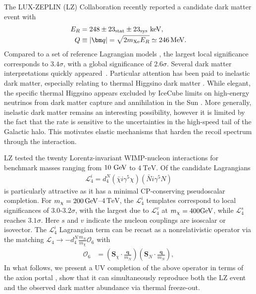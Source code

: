 \documentclass[notitlepage,floats,aps,nofootinbib,preprintnumbers,twocolumn,prl,10pt,balancelastpage]{revtex4-1}
\def\beq{\begin{equation}\begin{aligned}}
\def\eeq{\end{aligned}\end{equation}}
\newcommand{\Lag}{\mathcal L}
\newcommand{\Ocal}{\mathcal O}
\begin{document}
The LUX-ZEPLIN (LZ) Collaboration recently reported a candidate dark matter event with \cite{LZ:2026axp}
\begin{align}
 E_R&=248\pm23_{\rm stat}\pm23_{\rm sys}\ \mathrm{keV},\nonumber\\[-2pt]
 Q&\equiv|\bm q|=\sqrt{2m_{\rm Xe}E_R}\simeq246\,\mathrm{MeV}.
 \label{eq:event}
\end{align}
%
Compared to a set of reference Lagrangian models \cite{Anand:2013yka}, the largest local significance corresponds to $3.4\sigma$, with a  global significance of $2.6\sigma$.
%
Several dark matter interpretations quickly appeared~\cite{Lou:2026idn,Su:2026rwz,Yamashita:2026ump,Fan:2026kxx,Freese:2026sga,Wu:2026nhi,Yamashita:2026ump,Yin:2026jnn,DiMauro:2026ldr,Visinelli:2026kgt}.
Particular attention has been paid to inelastic dark matter, especially relating to thermal Higgsino dark matter
\cite{Fan:2026kxx,Freese:2026sga,Wu:2026nhi,Yamashita:2026ump,Yin:2026jnn,DiMauro:2026ldr,Visinelli:2026kgt}.
%
 While elegant, the specific thermal Higgsino appears excluded by IceCube limits on high-energy neutrinos from dark matter capture and annihilation in the Sun \cite{Pospelov:2026ewn}. More generally, inelastic dark matter remains an interesting possibility, however it is limited by the fact that the rate is sensitive to the uncertainties in the high-speed tail of the Galactic halo.  This motivates elastic mechanisms that harden the recoil spectrum through the interaction.


LZ tested the twenty Lorentz-invariant WIMP-nucleon interactions for benchmark masses ranging from $10~{\rm GeV}$ to $4~\mathrm{TeV}$.
%
Of the candidate Lagrangians 
\beq
\Lag_4^i=d_4^N(\bar\chi i\gamma^5\chi)(\bar N i\gamma^5N)
\eeq is particularly attractive as it has a minimal CP-conserving
pseudoscalar completion.
%
For $m_\chi=200\,{\rm GeV}$--$4\,\mathrm{TeV}$,  the  $\Lag_4^i$ templates correspond to local significances of
$3.0$-$3.2\sigma$, with the largest due to $\Lag_4^v$ at
$m_\chi=400{\rm GeV}$, while $\Lag_4^s$ reaches $3.1\sigma$.  Here $s$ and $v$ indicate the nucleon couplings are isoscalar or isovector.  The $\Lag_4^i$ Lagrangian term can be recast as a nonrelativistic operator via the matching  $\Lag_4 \rightarrow -d_4^N\frac{m_N}{m_\chi}\Ocal_6$ with \cite{Anand:2013yka}
\beq
 \Ocal_6&=\left(\bm S_\chi\!\cdot\!\frac{\bm q}{m_N}\right)
 \left(\bm S_N\!\cdot\!\frac{\bm q}{m_N}\right),
\eeq
In what follows, we present a UV completion of the above operator in terms of the axion portal  \cite{Nomura:2008ru}, show that it can simultaneously reproduce both the LZ event and the observed dark matter abundance via thermal freeze-out.
\end{document}
